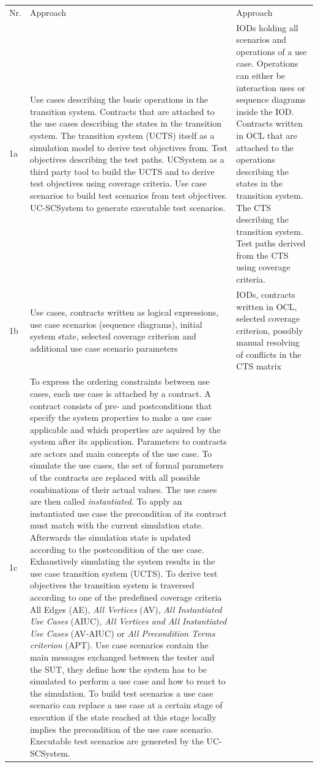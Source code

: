 \begin{longtable}[h]{p{0.5cm}p{}p{}}
	Nr. & Approach \cite{ClementineNebut2006} & Approach \cite{NajlaRaza2007} \\
	1a & 
	Use cases describing the basic operations in the transition system. Contracts that are attached to the use cases describing the states in the transition system. The transition system (UCTS) itself as a simulation model to derive test objectives from. Test objectives describing the test paths. UCSystem as a third party tool to build the UCTS and to derive test objectives using coverage criteria. Use case scenarios to build test scenarios from test objectives. UC-SCSystem to generate executable test scenarios.  & 
	IODs holding all scenarios and operations of a use case. Operations can either be interaction uses or sequence diagrams inside the IOD. Contracts written in OCL that are attached to the operations describing the states in the transition system. The CTS describing the transition system. Test paths derived from the CTS using coverage criteria.  \\
	1b & 
	Use cases, contracts written as logical expressions, use case scenarios (sequence diagrams), initial system state, selected coverage criterion and additional use case scenario parameters & 
	IODs, contracts written in OCL, selected coverage criterion, possibly manual resolving of conflicts in the CTS matrix \\
	1c &
	To express the ordering constraints between use cases, each use case is attached by a contract. A contract consists of pre- and postconditions that specify the system properties to make a use case applicable and which properties are aquired by the system after its application. Parameters to contracts are actors and main concepts of the use case. To simulate the use cases, the set of formal parameters of the contracts are replaced with all possible combinations of their actual values. The use cases are then called \textit{instantiated}. To apply an instantiated use case the precondition of its contract must match with the current simulation state. Afterwards the simulation state is updated according to the postcondition of the use case. Exhaustively simulating the system results in the use case transition system (UCTS). To derive test objectives the transition system is traversed according to one of the predefined coverage criteria {All Edges} (AE), \textit{All Vertices} (AV), \textit{All Instantiated Use Cases} (AIUC), \textit{All Vertices and All Instantiated Use Cases} (AV-AIUC) or \textit{All Precondition Terms criterion} (APT). Use case scenarios contain the main messages exchanged between the tester and the SUT, they define how the system has to be simulated to perform a use case and how to react to the simulation. To build test scenarios a use case scenario can replace a use case at a certain stage of execution if the state reached at this stage locally implies the precondition of the use case scenario. Executable test scenarios are genereted by the UC-SCSystem. &

\end{longtable}
